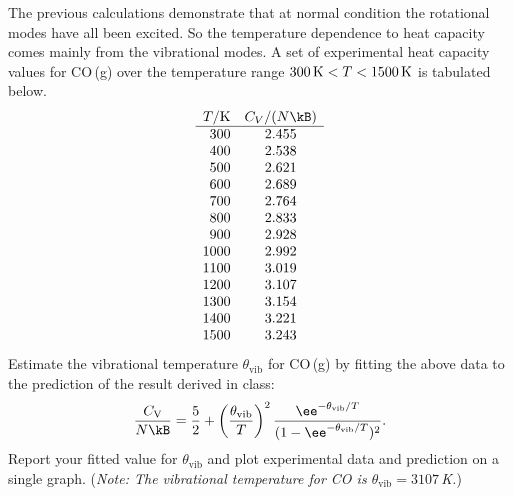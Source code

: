 \smallskip\subp
The previous calculations demonstrate that at normal condition
the rotational modes have all been excited.
So the temperature dependence to heat capacity comes mainly from the vibrational modes.
A set of experimental heat capacity values for CO\,(g)
over the temperature range $300\,{\rm K} < T < 1500\, {\rm K}$
is tabulated below.
$$\begin{array}{rc}
T/{\rm K} & C_V/(N \kB) \\
\hline
  300 & 2.455 \\
  400 & 2.538 \\
  500 & 2.621 \\
  600 & 2.689 \\
  700 & 2.764 \\
  800 & 2.833 \\
  900 & 2.928 \\
 1000 & 2.992 \\
 1100 & 3.019 \\
 1200 & 3.107 \\
 1300 & 3.154 \\
 1400 & 3.221 \\
 1500 & 3.243 \\
\end{array}$$
Estimate the vibrational temperature $\theta_\text{vib}$ for CO\,(g) by fitting the above
data to the prediction of the result derived in class:
$$ \frac{C_\text{V}}{N\kB} = \frac{5}{2} +
\left(\frac{\theta_\text{vib}}{T}\right)^2 \frac{\ee^{-\theta_\text{vib}/T}}
{(1 - \ee^{-\theta_\text{vib}/T})^2} .$$
Report your fitted value for $\theta_\text{vib}$ and plot
experimental data and prediction on a single graph.
({\sl Note: The vibrational temperature for CO is $\theta_\text{vib} = 3107\,$K.})


